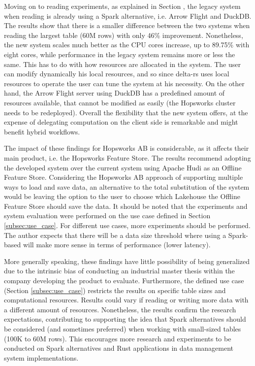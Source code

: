 Moving on to reading experiments, as explained in Section , the legacy system when reading is already using a Spark alternative, i.e. Arrow Flight and DuckDB. The results show that there is a smaller difference between the two systems when reading the largest table (60M rows) with only 46\% improvement. Nonetheless, the new system scales much better as the \gls{CPU} cores increase, up to 89.75\% with eight cores, while performance in the legacy system remains more or less the same. This has to do with how resources are allocated in the system. The user can modify dynamically his local resources, and so since delta-rs uses local resources to operate the user can tune the system at his necessity. On the other hand, the Arrow Flight server using DuckDB has a predefined amount of resources available, that cannot be modified as easily (the Hopsworks cluster needs to be redeployed). Overall the flexibility that the new system offers, at the expense of delegating computation on the client side is remarkable and might benefit hybrid workflows.

The impact of these findings for Hopsworks \gls{AB} is considerable, as it affects their main product, i.e. the Hopsworks Feature Store. The results recommend adopting the developed system over the current system using Apache Hudi as an Offline Feature Store. Considering the Hopsworks \gls{AB} approach of supporting multiple ways to load and save data, an alternative to the total substitution of the system would be leaving the option to the user to choose which Lakehouse the Offline Feature Store should save the data. It should be noted that the experiments and system evaluation were performed on the use case defined in Section \ref{subsec:use_case}. For different use cases, more experiments should be performed. The author expects that there will be a data size threshold where using a Spark-based will make more sense in terms of performance (lower latency).

More generally speaking, these findings have little possibility of being generalized due to the intrinsic bias of conducting an industrial master thesis within the company developing the product to evaluate. Furthermore, the defined use case (Section \ref{subsec:use_case}) restricts the results on specific table sizes and computational resources. Results could vary if reading or writing more data with a different amount of resources. Nonetheless, the results confirm the research expectations, contributing to supporting the idea that Spark alternatives should be considered (and sometimes preferred) when working with small-sized tables (100K to 60M rows). This encourages more research and experiments to be conducted on Spark alternatives and Rust applications in data management system implementations. 

